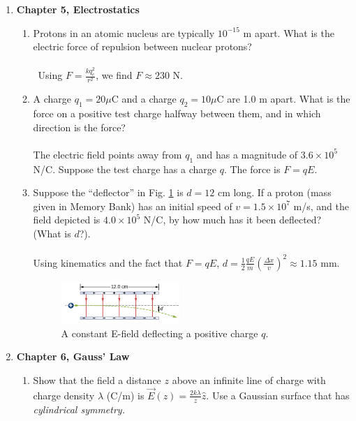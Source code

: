 \documentclass[10pt]{article}
\begin{document}
\clearpage

\begin{enumerate}
\item \textbf{Chapter 5, Electrostatics}
\begin{enumerate}
\item Protons in an atomic nucleus are typically $10^{-15}$ m apart. What is the electric force of repulsion between nuclear protons? \\ \\\
Using $F = \frac{k q_e^2}{r^2}$, we find $F \approx 230$ N. \\
\item A charge $q_1 = 20 \mu$C and a charge $q_2 = 10 \mu$C are 1.0 m apart.  What is the force on a positive test charge halfway between them, and in which direction is the force? \\ \\
The electric field points away from $q_1$ and has a magnitude of $3.6\times 10^5$ N/C.  Suppose the test charge has a charge $q$.  The force is $F = qE$. \\
\item Suppose the ``deflector'' in Fig. \ref{fig:e1} is $d=12$ cm long.  If a proton (mass given in Memory Bank) has an initial speed of $v=1.5 \times 10^{7}$ m/s, and the field depicted is $4.0 \times 10^5$ N/C, by how much has it been deflected?  (What is $d$?). \\ \\
Using kinematics and the fact that $F=qE$, $d = \frac{1}{2} \frac{qE}{m}\left(\frac{\Delta x}{v}\right)^2 \approx 1.15$ mm.
\begin{figure}
\centering
\includegraphics[width=0.45\textwidth]{figures/e1.png}
\caption{\label{fig:e1} A constant E-field deflecting a positive charge $q$.}
\end{figure}
\end{enumerate}
\item \textbf{Chapter 6, Gauss' Law}
\begin{enumerate}
\item Show that the field a distance $z$ above an infinite line of charge with charge density $\lambda$ (C/m) is $\vec{E}(z) = \frac{2k\lambda}{z}\hat{z}$.  Use a Gaussian surface that has \textit{cylindrical symmetry.} \\ \\

\end{enumerate}
\end{enumerate}
\end{document}
